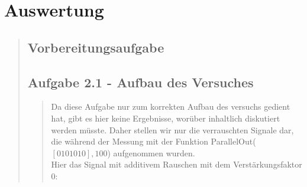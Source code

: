 \section{Auswertung}
\begin{quote}
    
    \subsection{Vorbereitungsaufgabe}
    \begin{quote}
        
    \end{quote}  %
    
    \subsection{Aufgabe 2.1 - Aufbau des Versuches}
    \begin{quote}
        
        Da diese Aufgabe nur zum korrekten Aufbau des versuchs gedient hat, gibt
        es hier keine Ergebnisse, worüber inhaltlich diskutiert werden müsste.
        Daher stellen wir nur die verrauschten Signale dar, die während der
        Messung mit der Funktion ParallelOut($[0 1 0 1 0 1 0],100$) aufgenommen
        wurden.\\
        
        Hier das Signal mit additivem Rauschen mit dem Verstärkungsfaktor $0$:
        

\end{quote}
\end{quote}
